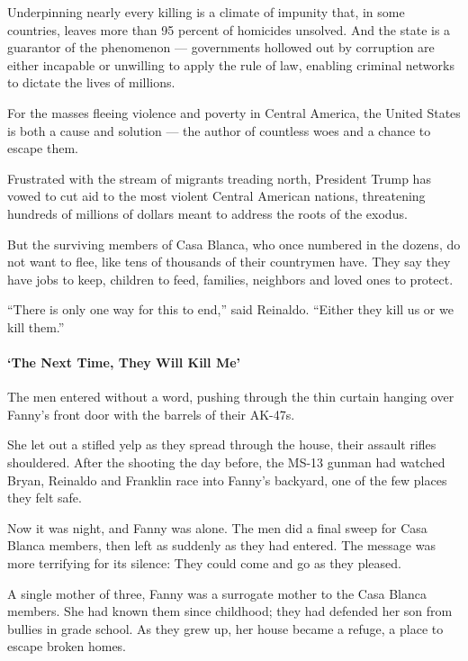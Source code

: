 Underpinning nearly every killing is a climate of impunity that, in some
countries, leaves more than 95 percent of homicides unsolved. And the
state is a guarantor of the phenomenon --- governments hollowed out by
corruption are either incapable or unwilling to apply the rule of law,
enabling criminal networks to dictate the lives of millions.

For the masses fleeing violence and poverty in Central America, the
United States is both a cause and solution --- the author of countless
woes and a chance to escape them.

Frustrated with the stream of migrants treading north, President Trump
has vowed to cut aid to the most violent Central American nations,
threatening hundreds of millions of dollars meant to address the roots
of the exodus.

But the surviving members of Casa Blanca, who once numbered in the
dozens, do not want to flee, like tens of thousands of their countrymen
have. They say they have jobs to keep, children to feed, families,
neighbors and loved ones to protect.

``There is only one way for this to end,'' said Reinaldo. ``Either they
kill us or we kill them.''

\hypertarget{the-next-time-they-will-kill-me}{%
\paragraph{`The Next Time, They Will Kill
Me'}\label{the-next-time-they-will-kill-me}}

The men entered without a word, pushing through the thin curtain hanging
over Fanny's front door with the barrels of their AK-47s.

She let out a stifled yelp as they spread through the house, their
assault rifles shouldered. After the shooting the day before, the MS-13
gunman had watched Bryan, Reinaldo and Franklin race into Fanny's
backyard, one of the few places they felt safe.

Now it was night, and Fanny was alone. The men did a final sweep for
Casa Blanca members, then left as suddenly as they had entered. The
message was more terrifying for its silence: They could come and go as
they pleased.

A single mother of three, Fanny was a surrogate mother to the Casa
Blanca members. She had known them since childhood; they had defended
her son from bullies in grade school. As they grew up, her house became
a refuge, a place to escape broken homes.

